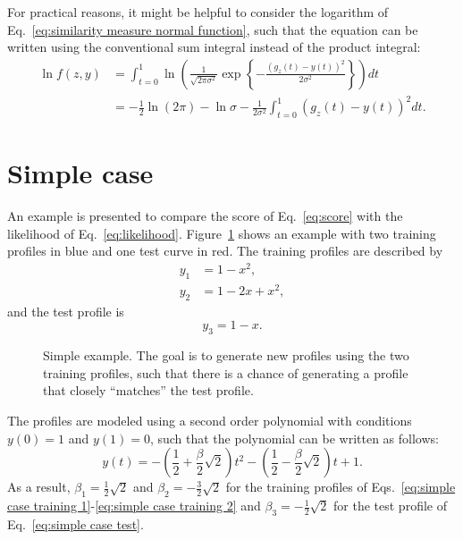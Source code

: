 \documentclass[10pt,final,a4paper,oneside,onecolumn]{article}
\newlength\figurewidth
\newlength\figureheight
\theoremstyle{plain}\newtheorem{definition}{Definition}[section]    %
\theoremstyle{definition}\newtheorem{example}{Example}[section]     %
\theoremstyle{remark}\newtheorem{remarkenv}{Remark}[section]        %
\begin{document}
For practical reasons, it might be helpful to consider the logarithm of Eq.~\eqref{eq:similarity measure normal function}, such that the equation can be written using the conventional sum integral instead of the product integral:
\begin{align}
	\ln f(z,y) &= \int_{t=0}^{1} \ln \left( \frac{1}{\sqrt{2\pi\sigma^2}} \exp \left\{ -\frac{(g_z(t)-y(t))^2}{2\sigma^2} \right\} \right) dt \\
	&= -\frac{1}{2} \ln (2\pi) - \ln \sigma - \frac{1}{2\sigma^2} \int_{t=0}^{1} (g_z(t) - y(t))^2 dt.
\end{align}



\section{Simple case}
\label{sec:simple case}

An example is presented to compare the score of Eq.~\eqref{eq:score} with the likelihood of Eq.~\eqref{eq:likelihood}. Figure~\ref{fig:simple example profiles} shows an example with two training profiles in blue and one test curve in red. The training profiles are described by 
\begin{align}
	y_1 &= 1 - x^2, \label{eq:simple case training 1} \\
	y_2 &= 1 - 2x + x^2, \label{eq:simple case training 2}
\end{align}
and the test profile is 
\begin{equation} \label{eq:simple case test}
	y_3 = 1-x.
\end{equation}

\begin{figure}
	\centering
	\setlength\figureheight{200pt}
	\setlength\figurewidth{300pt}
	
	\caption{Simple example. The goal is to generate new profiles using the two training profiles, such that there is a chance of generating a profile that closely ``matches'' the test profile.}
	\label{fig:simple example profiles}
\end{figure}

The profiles are modeled using a second order polynomial with conditions $y(0)=1$ and $y(1)=0$, such that the polynomial can be written as follows:
\begin{equation} \label{eq:simple case spline}
	y(t) = -\left( \frac{1}{2} + \frac{\beta}{2}\sqrt{2} \right) t^2 - \left( \frac{1}{2} - \frac{\beta}{2}\sqrt{2}\right) t + 1.
\end{equation}
As a result, $\beta_1=\frac{1}{2}\sqrt{2}$ and $\beta_2=-\frac{3}{2}\sqrt{2}$ for the training profiles of Eqs.~\eqref{eq:simple case training 1}-\eqref{eq:simple case training 2} and $\beta_3=-\frac{1}{2}\sqrt{2}$ for the test profile of Eq.~\eqref{eq:simple case test}. 
\end{document}
